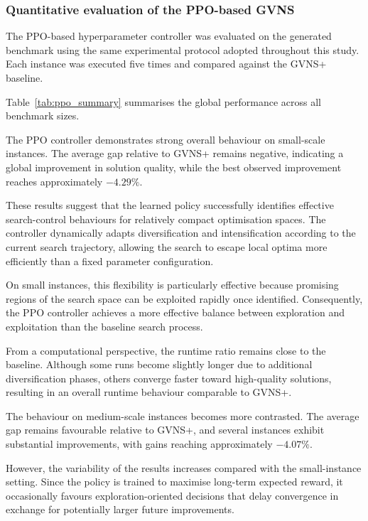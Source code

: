 \subsubsection{Quantitative evaluation of the PPO-based GVNS}

The PPO-based hyperparameter controller was evaluated on the generated benchmark using the same experimental protocol adopted throughout this study. Each instance was executed five times and compared against the GVNS+ baseline.

Table~\ref{tab:ppo_summary} summarises the global performance across all benchmark sizes.



The PPO controller demonstrates strong overall behaviour on small-scale instances. The average gap relative to GVNS+ remains negative, indicating a global improvement in solution quality, while the best observed improvement reaches approximately $-4.29\%$.

These results suggest that the learned policy successfully identifies effective search-control behaviours for relatively compact optimisation spaces. The controller dynamically adapts diversification and intensification according to the current search trajectory, allowing the search to escape local optima more efficiently than a fixed parameter configuration.

On small instances, this flexibility is particularly effective because promising regions of the search space can be exploited rapidly once identified. Consequently, the PPO controller achieves a more effective balance between exploration and exploitation than the baseline search process.

From a computational perspective, the runtime ratio remains close to the baseline. Although some runs become slightly longer due to additional diversification phases, others converge faster toward high-quality solutions, resulting in an overall runtime behaviour comparable to GVNS+.

The behaviour on medium-scale instances becomes more contrasted. The average gap remains favourable relative to GVNS+, and several instances exhibit substantial improvements, with gains reaching approximately $-4.07\%$.

However, the variability of the results increases compared with the small-instance setting. Since the policy is trained to maximise long-term expected reward, it occasionally favours exploration-oriented decisions that delay convergence in exchange for potentially larger future improvements.

